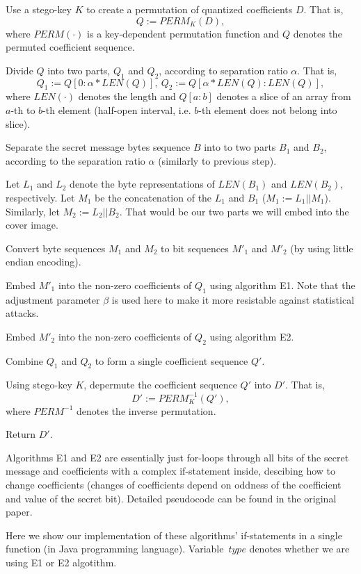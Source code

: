 \begin{Algo}
\item 
Use a stego-key $K$ to create a permutation of quantized coefficients $D$.
That is, $$Q := PERM_K(D),$$ where $PERM(\cdot)$ is a key-dependent
permutation function and $Q$ denotes the permuted coefficient sequence.
\item
Divide $Q$ into two parts, $Q_1$ and $Q_2$, according to separation ratio $\alpha$.
That is, $$Q_1 := Q[0 : \alpha * LEN(Q)],~ Q_2 := Q[\alpha * LEN(Q) : LEN(Q)],$$
where $LEN(\cdot)$ denotes the length and $Q[a : b]$ denotes a slice of an array from 
$a$-th to $b$-th element (half-open interval, i.e. $b$-th element does not belong into slice).
\item 
Separate the secret message bytes sequence $B$ into to two parts $B_1$ and $B_2$, 
according to the separation ratio $\alpha$ (similarly to previous step).
\item
Let $L_1$ and $L_2$ denote the byte representations of $LEN(B_1)$ and $LEN(B_2)$, respectively.
Let $M_1$ be the concatenation of the $L_1$ and $B_1$ ($M_1 := L_1 || M_1$). Similarly, let
$M_2 := L_2 || B_2$. That would be our two parts we will embed into the cover image.
\item
Convert byte sequences $M_1$ and $M_2$ to bit sequences $M'_1$ and $M'_2$ (by using little endian
encoding).
\item
Embed $M'_1$ into the non-zero coefficients of $Q_1$ using algorithm E1. Note that
the adjustment parameter $\beta$ is used here to make it more resistable against statistical attacks.
\item
Embed $M'_2$ into the non-zero coefficients of $Q_2$ using algorithm E2.
\item
Combine $Q_1$ and $Q_2$ to form a single coefficient sequence $Q'$.
\item 
Using stego-key $K$, depermute the coefficient sequence $Q'$ into $D'$. That is,
$$D' := PERM^{-1}_K(Q'),$$ where $PERM^{-1}$ denotes the inverse permutation.
\item 
Return $D'$.
\end{Algo}

Algorithms E1 and E2 are essentially just for-loops through all bits of the secret message
and coefficients with a complex if-statement inside, descibing how to change coefficients
(changes of coefficients depend on oddness of the coefficient and
value of the secret bit). Detailed pseudocode can be found in the original paper.

Here we show our implementation of these algorithms' if-statements 
in a single function (in Java programming language). 
Variable~$type$ denotes whether we are using E1 or E2 algotithm.

